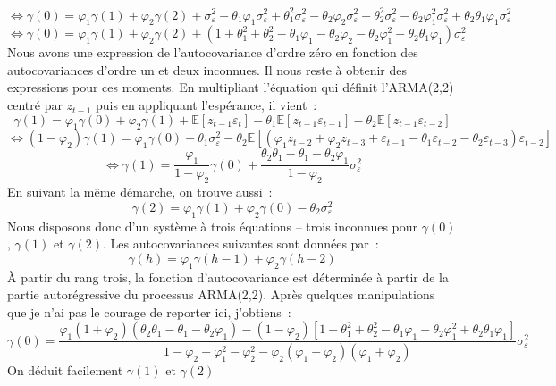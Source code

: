\documentclass[10pt,a4paper,notitlepage,onecolumn]{article}
\newcommand{\expectation}[1]{\mathbb E \left[ #1 \right]}
\begin{document}
\[
\Leftrightarrow \gamma(0) = \varphi_1 \gamma(1) + \varphi_2 \gamma(2) + \sigma_{\varepsilon}^2 -\theta_1\varphi_1\sigma_{\varepsilon}^2 + \theta_1^2\sigma_{\varepsilon}^2 -\theta_2\varphi_2\sigma_{\varepsilon}^2+ \theta_2^2\sigma_{\varepsilon}^2-\theta_2\varphi_1^2\sigma_{\varepsilon}^2+\theta_2\theta_1\varphi_1\sigma_{\varepsilon}^2
\]
\[
\Leftrightarrow \gamma(0) = \varphi_1 \gamma(1) + \varphi_2 \gamma(2) + \left(1+\theta_1^2 + \theta_2^2 - \theta_1\varphi_1 - \theta_2\varphi_2 -\theta_2\varphi_1^2 +\theta_2\theta_1\varphi_1\right)\sigma_{\varepsilon}^2
\]
Nous avons une expression de l'autocovariance d'ordre zéro en fonction
des  autocovariances d'ordre  un et  deux  inconnues. Il  nous reste  à
obtenir des  expressions pour  ces moments. En  multipliant l'équation
qui  définit   l'ARMA(2,2)  centré   par  $z_{t-1}$  puis   en  appliquant
l'espérance, il vient :
\[
\gamma(1) = \varphi_1 \gamma(0) + \varphi_2 \gamma(1) + \expectation{z_{t-1}\varepsilon_t} - \theta_1\expectation{z_{t-1}\varepsilon_{t-1}} - \theta_2\expectation{z_{t-1}\varepsilon_{t-2}}
\]
\[
\Leftrightarrow (1-\varphi_2)\gamma(1) = \varphi_1 \gamma(0) - \theta_1\sigma_{\varepsilon}^2 - \theta_2\expectation{\left(\varphi_1 z_{t-2} + \varphi_2 z_{t-3} + \varepsilon_{t-1} - \theta_1 \varepsilon_{t-2} - \theta_2 \varepsilon_{t-3}\right)\varepsilon_{t-2}}
\]
\[
\Leftrightarrow \gamma(1) = \frac{\varphi_1}{1-\varphi_2}\gamma(0) + \frac{\theta_2\theta_1-\theta_1-\theta_2\varphi_1}{1-\varphi_2}\sigma_{\varepsilon}^2
\]
En suivant la même démarche, on trouve aussi :
\[
\gamma(2) = \varphi_1\gamma(1) + \varphi_2\gamma(0) - \theta_2\sigma_{\varepsilon}^2
\]
Nous disposons donc d'un système à trois équations -- trois inconnues pour $\gamma(0)$, $\gamma(1)$ et $\gamma(2)$. Les autocovariances suivantes sont données par :
\[
\gamma(h) = \varphi_1\gamma(h-1) + \varphi_2\gamma(h-2)
\]
À partir du rang trois, la fonction d'autocovariance est déterminée à partir de la partie autorégressive du processus ARMA(2,2). Après quelques manipulations que je n'ai pas le courage de reporter ici, j'obtiens :
\[
\gamma(0) = \frac{\varphi_1(1+\varphi_2)(\theta_2\theta_1-\theta_1-\theta_2\varphi_1)-(1-\varphi_2)\left[1+\theta_1^2+\theta_2^2-\theta_1\varphi_1-\theta_2\varphi_1^2+\theta_2\theta_1\varphi_1\right]}{1-\varphi_2-\varphi_1^2-\varphi_2^2-\varphi_2(\varphi_1-\varphi_2)(\varphi_1+\varphi_2)}\sigma_{\varepsilon}^2
\]
On déduit facilement $\gamma(1)$ et $\gamma(2)$
\end{document}
